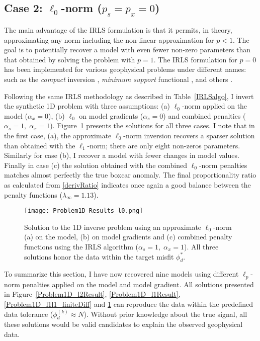\subsection{Case 2: $\ell_0$-norm ($p_s=p_x=0$)}
The main advantage of the IRLS formulation is that it permits, in theory, approximating any norm including the non-linear approximation for $p < 1$. The goal is to potentially recover a model with even fewer non-zero parameters than that obtained by solving the problem with $p=1$.
The IRLS formulation for $p=0$ has been implemented for various geophysical problems under different names: such as the \textit{compact} inversion \cite[]{LastKubik83}, \textit{minimum support} functional \cite[]{PortniaguineZhdanov02}, and others \cite[]{BarbosaSilva94, Chartrand07, Ajo-Franklin07, Blaschek2008, Stocco09}.

Following the same IRLS methodology as described in Table~\ref{IRLSalgo}, I invert the synthetic 1D problem with three assumptions: (a) $\ell_0$-norm applied on the model ($\alpha_x = 0$), (b) $\ell_0$ on model gradients ($\alpha_s = 0$) and combined penalties ($\alpha_s=1,\;\alpha_x = 1$). Figure~\ref{Problem1D_l0Result} presents the solutions for all three cases. I note that in the first case, (a), the approximate $\ell_0$-norm inversion recovers a sparser solution than obtained with the $\ell_1$-norm; there are only eight non-zeros parameters. Similarly for case (b), I recover a model with fewer changes in model values. Finally in case (c) the solution obtained with the combined $\ell_0$-norm penalties matches almost perfectly the true boxcar anomaly. The final proportionality ratio as calculated from \eqref{derivRatio} indicates once again a good balance between the penalty functions ($\lambda_\infty = 1.13$).
\begin{figure}
\texttt{[image: Problem1D\_Results\_l0.png]}
\caption{Solution to the 1D inverse problem using an approximate $\ell_0$-norm (a) on the model, (b) on model gradients and (c) combined penalty functions using the IRLS algorithm ($\alpha_s=1,\;\alpha_x = 1$). All three solutions honor the data within the target misfit $\phi_d^*$.}
\label{Problem1D_l0Result}
\end{figure}

To summarize this section, I have now recovered nine models using different $\ell_p$-norm penalties applied on the model and model gradient. All solutions presented in Figure~\ref{Problem1D_l2Result}, \ref{Problem1D_l1Result}, \ref{Problem1D_l1l1_finiteDiff} and \ref{Problem1D_l0Result} can reproduce the data within the predefined data tolerance ($\phi_d^{(k)} \approx N$). Without prior knowledge about the true signal, all these solutions would be valid candidates to explain the observed geophysical data.



